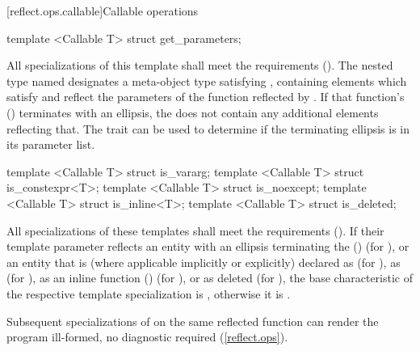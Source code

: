 [reflect.ops.callable]{Callable operations}
\begin{std.txt}\color{addclr}
\begin{itemdecl}
template <Callable T> struct get_parameters;
\end{itemdecl}
\begin{itemdescr}
\pnum
      All specializations of this template shall meet the  requirements (). The nested type named  designates a meta-object type satisfying , containing elements which satisfy  and reflect the parameters of the function reflected by .
      If that function's  () terminates with an ellipsis, the  does not contain any additional elements reflecting that. The  trait can be used to determine if the terminating ellipsis is in its parameter list.
\end{itemdescr}

\begin{itemdecl}
template <Callable T> struct is_vararg;
template <Callable T> struct is_constexpr<T>;
template <Callable T> struct is_noexcept;
template <Callable T> struct is_inline<T>;
template <Callable T> struct is_deleted;
\end{itemdecl}
\begin{itemdescr}
\pnum
      All specializations of these templates shall meet the
       requirements ().  If their template
      parameter reflects an entity with an ellipsis terminating the
       () (for
      ), or an entity that is (where applicable implicitly or
      explicitly) declared as  (for ),
      as  (for ), as an inline function
      () (for ), or as deleted (for
      ), the base characteristic of the respective template
      specialization is , otherwise it is .

\pnum
\remarks
Subsequent specializations of  on the same reflected
function can render the program ill-formed, no diagnostic required
(\ref{reflect.ops}).
\end{itemdescr}
\end{std.txt}

